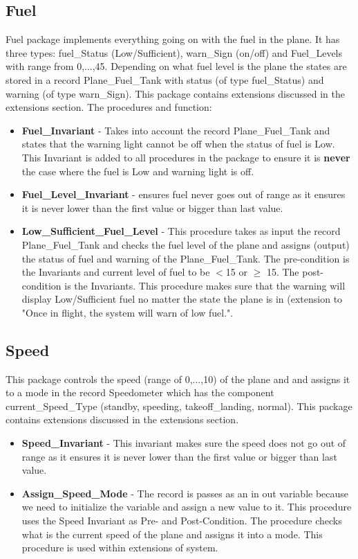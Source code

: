 \documentclass{llncs}
\begin{document}
\subsection{Fuel}
Fuel package implements everything going on with the fuel in the plane. It has three types: fuel\_Status (Low/Sufficient), warn\_Sign (on/off) and Fuel\_Levels with range from 0,...,45. Depending on what fuel level is the plane the states are stored in a record Plane\_Fuel\_Tank with status (of type fuel\_Status) and warning (of type warn\_Sign). This package contains extensions discussed in the extensions section. The procedures and function:
\begin{itemize}
\item \textbf{Fuel\_Invariant} - Takes into account the record Plane\_Fuel\_Tank and states that the warning light cannot be off when the status of fuel is Low. This Invariant is added to all procedures in the package to ensure it is \textbf{never} the case where the fuel is Low and warning light is off.
\item \textbf{Fuel\_Level\_Invariant} - ensures fuel never goes out of range as it ensures it is never lower than the first value or bigger than last value. 
\item \textbf{Low\_Sufficient\_Fuel\_Level} - This procedure takes as input the record Plane\_Fuel\_Tank and checks the fuel level of the plane and assigns (output) the status of fuel and warning of the Plane\_Fuel\_Tank.  The pre-condition is the Invariants and current level of fuel to be  $<$15 or $\geqslant$ 15.  The post-condition is the Invariants. This procedure makes sure that the warning will display Low/Sufficient fuel no matter the state the plane is in (extension to "Once in flight, the system will warn of low fuel.".
\end{itemize}
\subsection{Speed}
This package controls the speed (range of 0,...,10) of the plane and and assigns it to a mode in the record Speedometer which has the component current\_Speed\_Type (standby, speeding, takeoff\_landing, normal). This package contains extensions discussed in the extensions section.
\begin{itemize}
\item \textbf{Speed\_Invariant} - This invariant makes sure the speed does not go out of range as it ensures it is never lower than the first value or bigger than last value. 
\item \textbf{Assign\_Speed\_Mode} -  The record is passes as an in out variable because we need to initialize the variable and assign a new value to it. This procedure uses the Speed Invariant as Pre- and Post-Condition. The procedure checks what is the current speed of the plane and assigns it into a mode. This procedure is used within extensions of system.
\end{itemize}
\end{document}
